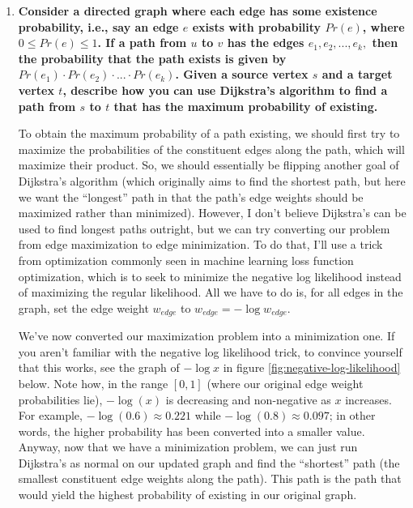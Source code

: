 \documentclass[12pt]{article}
\begin{document}
\begin{enumerate}
        \item \textbf{Consider a directed graph where each edge has some existence probability, i.e., say an edge $e$ 
        exists with probability $Pr(e)$, where $0 \leq Pr(e) \leq 1$. If a path from $u$ to $v$ has the edges 
        $e_1, e_2, ..., e_k, $ then the probability that the path exists is given by $Pr(e_1) \cdot Pr(e_2) \cdot ... 
        \cdot Pr(e_k)$. Given a source vertex $s$ and a target vertex $t$, describe how you can use Dijkstra's algorithm 
        to find a path from $s$ to $t$ that has the maximum probability of existing.}

        To obtain the maximum probability of a path existing, we should first try to maximize the probabilities of the 
        constituent edges along the path, which will maximize their product. So, we should essentially be flipping another goal of 
        Dijkstra's algorithm (which originally aims to find the shortest path, but here we want the ``longest'' path in 
        that the path's edge weights should be maximized rather than minimized). However, I don't believe Dijkstra's can be used 
        to find longest paths outright, but we can try converting our problem from edge maximization to edge minimization. 
        To do that, I'll use a trick from optimization commonly seen in machine learning loss function optimization, which is 
        to seek to minimize the negative log likelihood instead of maximizing the regular likelihood. All we have to do is, for all edges 
        in the graph, set the edge weight $w_{edge}$ to $w_{edge} = -\log w_{edge}$.

        We've now converted our maximization problem into a minimization one. If you aren't familiar with the negative 
        log likelihood trick, to convince yourself that this works, see the graph of $-\log x$ in figure 
        \ref{fig:negative-log-likelihood} below. Note how, in the range $[0, 1]$ (where our original edge weight probabilities 
        lie), $-\log (x)$ is decreasing and non-negative as $x$ increases. For example, $-\log (0.6) \approx 0.221$ while $-\log (0.8) \approx 0.097$; 
        in other words, the higher probability has been converted into a smaller value. Anyway, now that we have a 
        minimization problem, we can just run Dijkstra's as normal on our updated graph and find the ``shortest'' path 
        (the smallest constituent edge weights along the path). This path is the path that would yield the highest 
        probability of existing in our original graph.


\end{enumerate}
\end{document}
